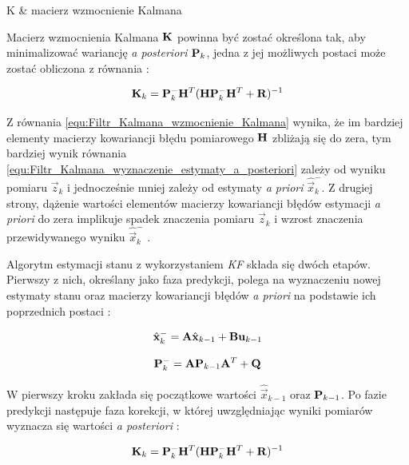 \begin{conditions}
	K & macierz wzmocnienie Kalmana \\
\end{conditions}

Macierz wzmocnienia Kalmana $\mathbf{K}$ powinna być zostać określona tak, aby minimalizować wariancję \textit{a posteriori} $\mathbf{P}_k$, jedna z jej możliwych postaci może zostać obliczona z równania \cite{Welch1995}:

\begin{equation}
\label{equ:Filtr_Kalmana_wzmocnienie_Kalmana}
	\mathbf{K}_k = \mathbf{P}_k^- \mathbf{H}^T ( \mathbf{H} \mathbf{P}_k^- \mathbf{H}^T +\mathbf{R} ) ^ {-1}
\end{equation}

Z równania \ref{equ:Filtr_Kalmana_wzmocnienie_Kalmana} wynika, że im bardziej elementy macierzy kowariancji błędu pomiarowego $\mathbf{H}$ zbliżają się do zera, tym bardziej wynik równania \ref{equ:Filtr_Kalmana_wyznaczenie_estymaty_a_posteriori} zależy od wyniku pomiaru $\vec{z}_k$ i jednocześnie mniej zależy od estymaty \textit{a priori} $\hat{\vec{x}}_k^-$. Z drugiej strony, dążenie wartości elementów macierzy kowariancji błędów estymacji \textit{a priori} do zera implikuje spadek znaczenia pomiaru $\vec{z}_k$ i wzrost znaczenia przewidywanego wyniku $\hat{\vec{x}}_k^-$ \cite{Welch1995}.

Algorytm estymacji stanu z wykorzystaniem \textit{KF} składa się dwóch etapów. Pierwszy z nich, określany jako faza predykcji, polega na wyznaczeniu nowej estymaty stanu oraz macierzy kowariancji błędów \textit{a priori} na podstawie ich poprzednich postaci \cite{Welch1995}:

\begin{equation}
\label{equ:Filtr_Kalmana_faza_predykcji_stan}
	\hat{\mathbf{x}}_k^- = \mathbf{A} \hat{\mathbf{x}}_{k-1} + \mathbf{B} \mathbf{u}_{k - 1}
\end{equation}

\begin{equation}
\label{equ:Filtr_Kalmana_faza_predykcji_macierz_kowariancji_bledow}
	\mathbf{P}_k^- = \mathbf{A} \mathbf{P}_{k-1} \mathbf{A}^T + \mathbf{Q}
\end{equation}

W pierwszy kroku zakłada się początkowe wartości $\hat{\vec{x}}_{k-1}$ oraz $\mathbf{P}_{k-1}$. Po fazie predykcji następuje faza korekcji, w której uwzględniając wyniki pomiarów wyznacza się wartości \textit{a posteriori} \cite{Welch1995}:

\begin{equation}
\label{equ:Filtr_Kalmana_faza_korekcji_wzmocnienie}
	\mathbf{K}_k = \mathbf{P}_k^- \mathbf{H}^T ( \mathbf{H} \mathbf{P}_k^- \mathbf{H}^T +\mathbf{R} ) ^ {-1}
\end{equation}

